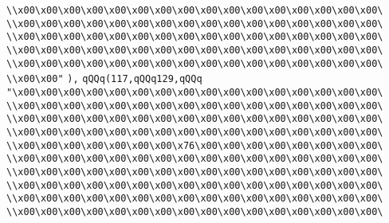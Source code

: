 \verb|\\x00\x00\x00\x00\x00\x00\x00\x00\x00\x00\x00\x00\x00\x00\x00\x00\|\newline
\verb|\\x00\x00\x00\x00\x00\x00\x00\x00\x00\x00\x00\x00\x00\x00\x00\x00\|\newline
\verb|\\x00\x00\x00\x00\x00\x00\x00\x00\x00\x00\x00\x00\x00\x00\x00\x00\|\newline
\verb|\\x00\x00\x00\x00\x00\x00\x00\x00\x00\x00\x00\x00\x00\x00\x00\x00\|\newline
\verb|\\x00\x00\x00\x00\x00\x00\x00\x00\x00\x00\x00\x00\x00\x00\x00\x00\|\newline
\verb|\\x00\x00"|\newline
\verb|),|\newline
\verb|qQQq(117,qQQq129,qQQq|\newline
\verb|"\x00\x00\x00\x00\x00\x00\x00\x00\x00\x00\x00\x00\x00\x00\x00\x00\|\newline
\verb|\\x00\x00\x00\x00\x00\x00\x00\x00\x00\x00\x00\x00\x00\x00\x00\x00\|\newline
\verb|\\x00\x00\x00\x00\x00\x00\x00\x00\x00\x00\x00\x00\x00\x00\x00\x00\|\newline
\verb|\\x00\x00\x00\x00\x00\x00\x00\x00\x00\x00\x00\x00\x00\x00\x00\x00\|\newline
\verb|\\x00\x00\x00\x00\x00\x00\x00\x76\x00\x00\x00\x00\x00\x00\x00\x00\|\newline
\verb|\\x00\x00\x00\x00\x00\x00\x00\x00\x00\x00\x00\x00\x00\x00\x00\x00\|\newline
\verb|\\x00\x00\x00\x00\x00\x00\x00\x00\x00\x00\x00\x00\x00\x00\x00\x00\|\newline
\verb|\\x00\x00\x00\x00\x00\x00\x00\x00\x00\x00\x00\x00\x00\x00\x00\x00\|\newline
\verb|\\x00\x00\x00\x00\x00\x00\x00\x00\x00\x00\x00\x00\x00\x00\x00\x00\|\newline
\verb|\\x00\x00\x00\x00\x00\x00\x00\x00\x00\x00\x00\x00\x00\x00\x00\x00\|\newline
